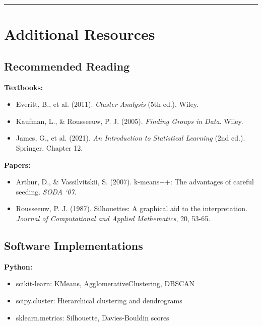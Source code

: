 \documentclass[
]{article}
\begin{document}
\begin{center}\rule{0.5\linewidth}{0.5pt}\end{center}

\textbf{ }

\section{Additional Resources}

\textbf{ }

\subsection{Recommended Reading}

\textbf{Textbooks:}

\begin{itemize}
\item
  Everitt, B., et al. (2011). \emph{Cluster Analysis} (5th ed.). Wiley.
\item
  Kaufman, L., \& Rousseeuw, P. J. (2005). \emph{Finding Groups in
  Data}. Wiley.
\item
  James, G., et al. (2021). \emph{An Introduction to Statistical
  Learning} (2nd ed.). Springer. Chapter 12.
\end{itemize}

\textbf{Papers:}

\begin{itemize}
\item
  Arthur, D., \& Vassilvitskii, S. (2007). k-means++: The advantages of
  careful seeding. \emph{SODA `07}.
\item
  Rousseeuw, P. J. (1987). Silhouettes: A graphical aid to the
  interpretation. \emph{Journal of Computational and Applied
  Mathematics}, 20, 53-65.
\end{itemize}

\textbf{ }

\subsection{Software Implementations}

\textbf{Python:}

\begin{itemize}
\item
  scikit-learn: KMeans, AgglomerativeClustering, DBSCAN
\item
  scipy.cluster: Hierarchical clustering and dendrograms
\item
  sklearn.metrics: Silhouette, Davies-Bouldin scores
\end{itemize}
\end{document}
